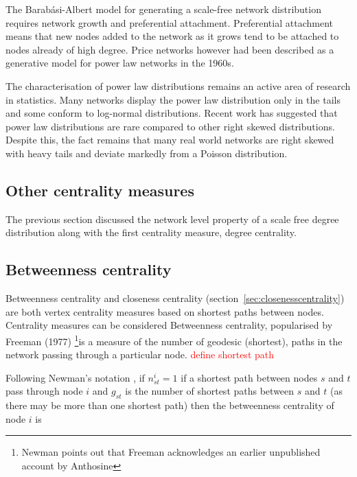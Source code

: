 The Barab\'asi-Albert model for generating a scale-free network distribution requires network growth and preferential attachment. Preferential attachment means that new nodes added to the network as it grows tend to be attached to nodes already of high degree\cite{barabasi1999emergence}. Price networks however had been described as a generative model for power law networks in the 1960s\cite{price1965networks}. 

The characterisation of power law distributions remains an active area of research in statistics. Many networks display the power law distribution only in the tails and some conform to log-normal distributions. Recent work has suggested that power law distributions are rare compared to other right skewed distributions\cite{broido2019scale}.  Despite this, the fact remains that many real world networks are right skewed with heavy tails and deviate markedly from a Poisson distribution. 





\subsection{ Other centrality measures}

The previous section discussed the network level property of a scale free degree distribution along with the first centrality measure, degree centrality. 
\subsection{Betweenness centrality }
\label{sec:Betweeness centrality}
Betweenness centrality and closeness centrality (section~\ref{sec:closenesscentrality})  are both vertex centrality measures based on shortest paths between nodes\cite{newman2018networks}. Centrality measures can be considered Betweenness centrality, popularised by Freeman (1977) \cite{freeman1977set}\footnote{Newman \cite{newman2018networks} points out that Freeman acknowledges an earlier unpublished account by Anthosine}is a measure of the number of geodesic (shortest), paths in the network passing through a particular node. \textcolor{red}{define shortest path} 

 Following Newman's notation \cite{newman2018networks}, if $n_{st}^i=1$  if a shortest path between nodes $s$ and $t$ pass through node $i$ and  $g_{st}$ is the number of shortest paths between $s$ and $t$ (as there may be more than one shortest path) then the betweenness centrality of node $i$ is

